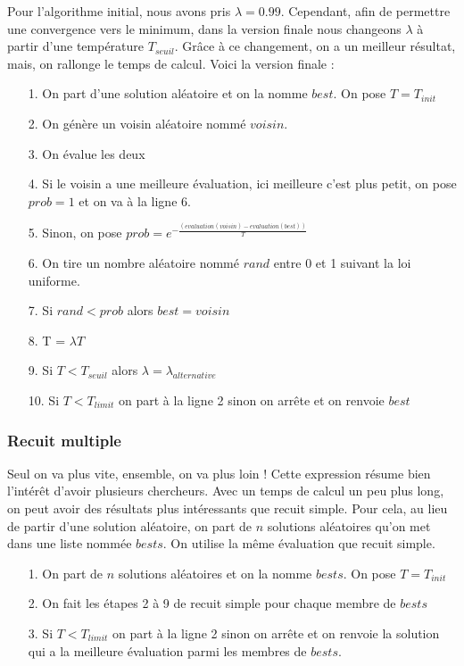 \documentclass[11pt,french]{report}
\begin{document}
	
	Pour l'algorithme initial, nous avons pris $\lambda = 0.99$. Cependant, afin de permettre une convergence vers le minimum, dans la version finale nous changeons $\lambda$ à partir d'une température $T_{seuil}$. Grâce à ce changement, on a un meilleur résultat, mais, on rallonge le temps de calcul. Voici la version finale :\\
	\begin{itemize}
		\item[1.] On part d'une solution aléatoire et on la nomme $best$. On pose $T = T_{init}$
		\item[2.] On génère un voisin aléatoire nommé $voisin$.
		\item[3.] On évalue les deux
		\item[4.] Si le voisin a une meilleure évaluation, ici meilleure c'est plus petit, on pose $prob = 1$ et on va à la ligne 6.
		\item[5.] Sinon, on pose $prob = e^{-\frac{(evaluation(voisin) - evaluation(best))}{T}}$
		\item[6.] On tire un nombre aléatoire nommé $rand$ entre 0 et 1 suivant la loi uniforme.
		\item[7.] Si $rand < prob$ alors $best = voisin$
		\item[8.] T = $\lambda T$
		\item[9.] Si $T<T_{seuil}$ alors $\lambda = \lambda_{alternative}$
		\item[10.] Si $T<T_{limit}$ on part à la ligne 2 sinon on arrête et on renvoie $best$
	\end{itemize}
	
	\subsubsection{Recuit multiple\label{recuit multiple}}
	Seul on va plus vite, ensemble, on va plus loin ! Cette expression résume bien l'intérêt d'avoir plusieurs chercheurs. Avec un temps de calcul un peu plus long, on peut avoir des résultats plus intéressants que recuit simple. Pour cela, au lieu de partir d'une solution aléatoire, on part de $n$ solutions aléatoires qu'on met dans une liste nommée $bests$. On utilise la même évaluation que recuit simple.\\
	
	\begin{itemize}
		\item[1.] On part de $n$ solutions aléatoires et on la nomme $bests$. On pose $T = T_{init}$
		\item[2.] On fait les étapes 2 à 9 de recuit simple pour chaque membre de $bests$
		\item[3.] Si $T<T_{limit}$ on part à la ligne 2 sinon on arrête et on renvoie la solution qui a la meilleure évaluation parmi les membres de $bests$.\\
	\end{itemize}
	
\end{document}
